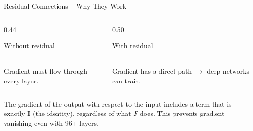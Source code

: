 \documentclass[aspectratio=169]{beamer}
\begin{document}
\begin{frame}{Residual Connections – Why They Work}
  \begin{columns}[c]
    \begin{column}{0.44\textwidth}
      \begin{block}{Without residual}
        \centering\vspace{0.3em}
        \\[0.3em]
        {\small Gradient must flow through every layer.}
        \vspace{0.3em}
      \end{block}
    \end{column}
    \begin{column}{0.50\textwidth}
      \begin{block}{With residual}
        \centering\vspace{0.3em}
        \\[0.3em]
        {\small Gradient has a direct path $\to$ deep networks can train.}
        \vspace{0.3em}
      \end{block}
    \end{column}
  \end{columns}

  \vspace{0.6em}
  The gradient of the output with respect to the input includes a term that is exactly
  $\mathbf{I}$ (the identity), regardless of what $F$ does.  This prevents gradient
  vanishing even with 96+ layers.
\end{frame}
%
%
\end{document}
